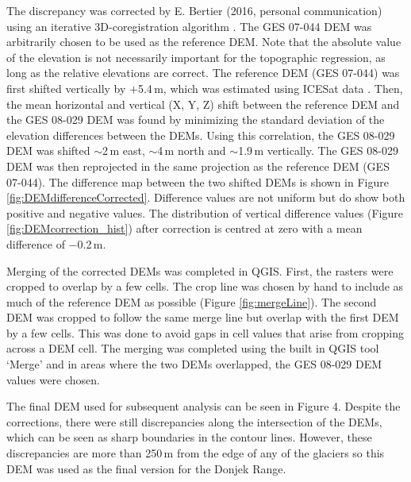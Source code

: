 \documentclass{sfuthesis}
\begin{document}
The discrepancy was corrected by E. Bertier (2016, personal communication) using an iterative 3D-coregistration algorithm \citep{Berthier2007}. The GES 07-044 DEM was arbitrarily chosen to be used as the reference DEM. Note that the absolute value of the elevation is not necessarily important for the topographic regression, as long as the relative elevations are correct. The reference DEM (GES 07-044) was first shifted vertically by $+$5.4\,m, which was estimated using ICESat data \citep{Berthier2010}. Then, the mean horizontal and vertical (X, Y, Z) shift between the reference DEM and the GES 08-029 DEM was found by minimizing the standard deviation of the elevation differences between the DEMs. Using this correlation, the GES 08-029 DEM  was shifted $\sim$2\,m east, $\sim$4\,m north and $\sim$1.9\,m vertically. The GES 08-029 DEM was then reprojected in the same projection as the reference DEM (GES 07-044). The difference map between the two shifted DEMs is shown in Figure \ref{fig:DEMdifferenceCorrected}. Difference values are not uniform but do show both positive and negative values. The distribution of vertical difference values (Figure \ref{fig:DEMcorrection_hist}) after correction is centred at zero with a mean difference of $-$0.2\,m.

Merging of the corrected DEMs was completed in QGIS. First, the rasters were cropped to overlap by a few cells. The crop line was chosen by hand to include as much of the reference DEM as possible (Figure \ref{fig:mergeLine}). The second DEM was cropped to follow the same merge line but overlap with the first DEM by a few cells. This was done to avoid gaps in cell values that arise from cropping across a DEM cell. The merging was completed using the built in QGIS tool `Merge' and in areas where the two DEMs overlapped, the GES 08-029 DEM values were chosen.

The final DEM used for subsequent analysis can be seen in Figure 4. Despite the corrections, there were still discrepancies along the intersection of the DEMs, which can be seen as sharp boundaries in the contour lines. However, these discrepancies are more than 250\,m from the edge of any of the glaciers so this DEM was used as the final version for the Donjek Range.

\begin{figure}[H]
  \label{fig:finalDEM}
\end{figure}
\end{document}
